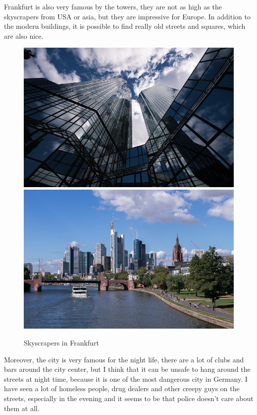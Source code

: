\documentclass[english]{article}
\begin{document}
Frankfurt is also very famous by the towers, they are not as high as the skyscrapers from USA or asia, but they are impressive for Europe. In addition to the modern buildings, it is possible to find really old streets and squares, which are also nice.\\

\begin{figure}
\includegraphics[scale=0.33]{Germany_travel/fk1}\includegraphics[scale=0.33]{Germany_travel/fk2}\\
\caption{Skyscrapers in Frankfurt}
\end{figure}

Moreover, the city is very famous for the night life, there are a lot of clubs and bars around the city center, but I think that it can be unsafe to hang around the streets at night time, because it is one of the most dangerous city in Germany. I have seen a lot of homeless people, drug dealers and other creepy guys on the streets, especially in the evening and it seems to be that police doesn't care about them at all.\\
\end{document}
